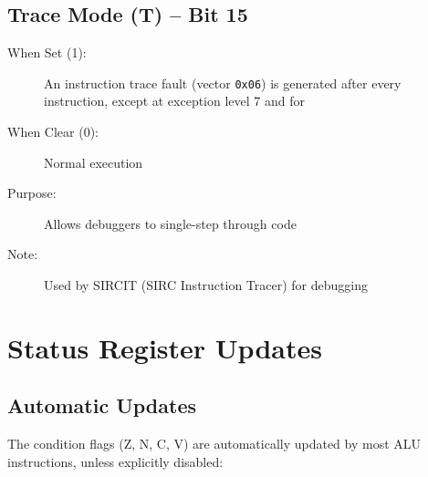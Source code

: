 \subsection{Trace Mode (T) -- Bit 15}

\begin{description}
	\item[When Set (1):] An instruction trace fault (vector \texttt{0x06}) is generated after every instruction, except at
	      exception level 7 and for 
	\item[When Clear (0):] Normal execution
	\item[Purpose:] Allows debuggers to single-step through code
	\item[Note:] Used by SIRCIT (SIRC Instruction Tracer) for debugging
\end{description}

\section{Status Register Updates}

\subsection{Automatic Updates}

The condition flags (Z, N, C, V) are automatically updated by most ALU instructions, unless explicitly disabled:

